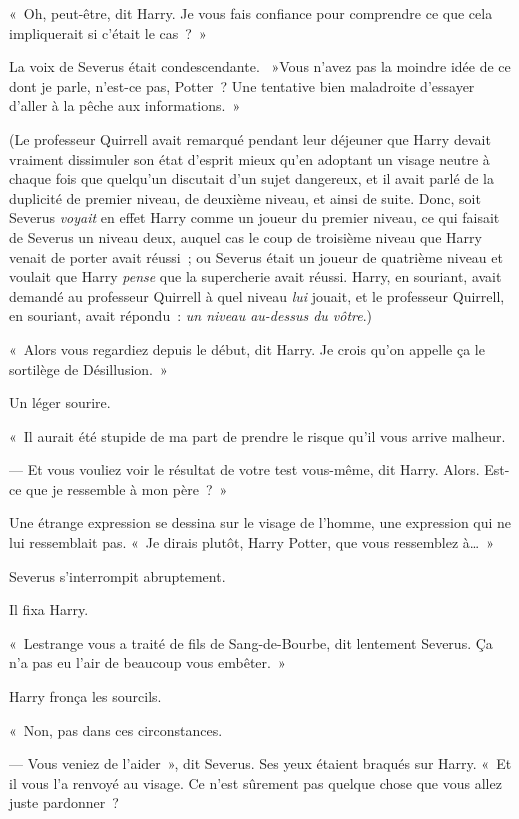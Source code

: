 «~Oh, peut-être, dit Harry.
Je vous fais confiance pour comprendre ce que cela impliquerait si c'était le cas~?~»

La voix de Severus était condescendante.
~»Vous n'avez pas la moindre idée de ce dont je parle, n'est-ce pas, Potter~?
Une tentative bien maladroite d'essayer d'aller à la pêche aux informations.~»

(Le professeur Quirrell avait remarqué pendant leur déjeuner que Harry devait vraiment dissimuler son état d'esprit mieux qu'en adoptant un visage neutre à chaque fois que quelqu'un discutait d'un sujet dangereux, et il avait parlé de la duplicité de premier niveau, de deuxième niveau, et ainsi de suite.
Donc, soit Severus \emph{voyait} en effet Harry comme un joueur du premier niveau, ce qui faisait de Severus un niveau deux, auquel cas le coup de troisième niveau que Harry venait de porter avait réussi~; ou Severus était un joueur de quatrième niveau et voulait que Harry \emph{pense} que la supercherie avait réussi.
Harry, en souriant, avait demandé au professeur Quirrell à quel niveau \emph{lui} jouait, et le professeur Quirrell, en souriant, avait répondu~: \emph{un niveau au-dessus du vôtre}.)

«~Alors vous regardiez depuis le début, dit Harry.
Je crois qu'on appelle ça le sortilège de Désillusion.~»

Un léger sourire.

«~Il aurait été stupide de ma part de prendre le risque qu'il vous arrive malheur.

--- Et vous vouliez voir le résultat de votre test vous-même, dit Harry.
Alors. Est-ce que je ressemble à mon père~?~»

Une étrange expression se dessina sur le visage de l'homme, une expression qui ne lui ressemblait pas.
«~Je dirais plutôt, Harry Potter, que vous ressemblez à…~»

Severus s'interrompit abruptement.

Il fixa Harry.

«~Lestrange vous a traité de fils de Sang-de-Bourbe, dit lentement Severus.
Ça n'a pas eu l'air de beaucoup vous embêter.~»

Harry fronça les sourcils.

«~Non, pas dans ces circonstances.

--- Vous veniez de l'aider~», dit Severus.
Ses yeux étaient braqués sur Harry.
«~Et il vous l'a renvoyé au visage.
Ce n'est sûrement pas quelque chose que vous allez juste pardonner~?

